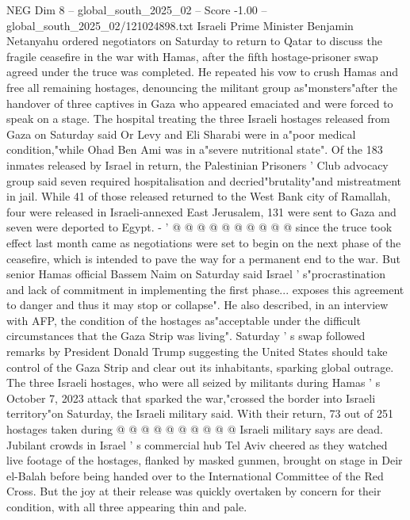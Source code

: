\begin{textsample}{NEG Dim 8 – global\_south\_2025\_02 – Score -1.00 – global\_south\_2025\_02/121024898.txt}  \label{ex:f8_neg_068}
Israeli Prime Minister Benjamin Netanyahu ordered negotiators on Saturday to return to Qatar to discuss the fragile ceasefire in the war with Hamas, after the fifth hostage-prisoner swap agreed under the truce was completed.
He repeated his vow to crush Hamas and free all remaining hostages, denouncing the militant group as"monsters"after the handover of three captives in Gaza who appeared emaciated and were forced to speak on a stage.
The hospital treating the three Israeli hostages released from Gaza on Saturday said Or Levy and Eli Sharabi were in a"poor medical condition,"while Ohad Ben Ami was in a"severe nutritional state".
Of the 183 inmates released by Israel in return, the Palestinian Prisoners ' Club advocacy group said seven required hospitalisation and decried"brutality"and mistreatment in jail.
While 41 of those released returned to the West Bank city of Ramallah, four were released in Israeli-annexed East Jerusalem, 131 were sent to Gaza and seven were deported to Egypt. - ' @ @ @ @ @ @ @ @ @ @ since the truce took effect last month came as negotiations were set to begin on the next phase of the ceasefire, which is intended to pave the way for a permanent end to the war.
But senior Hamas official Bassem Naim on Saturday said Israel ' s"procrastination and lack of commitment in implementing the first phase... exposes this agreement to danger and thus it may stop or collapse".
He also described, in an interview with AFP, the condition of the hostages as"acceptable under the difficult circumstances that the Gaza Strip was living".
Saturday ' s swap followed remarks by President Donald Trump suggesting the United States should take control of the Gaza Strip and clear out its inhabitants, sparking global outrage.
The three Israeli hostages, who were all seized by militants during Hamas ' s October 7, 2023 attack that sparked the war,"crossed the border into Israeli territory"on Saturday, the Israeli military said.
With their return, 73 out of 251 hostages taken during @ @ @ @ @ @ @ @ @ @ Israeli military says are dead.
Jubilant crowds in Israel ' s commercial hub Tel Aviv cheered as they watched live footage of the hostages, flanked by masked gunmen, brought on stage in Deir el-Balah before being handed over to the International Committee of the Red Cross.
But the joy at their release was quickly overtaken by concern for their condition, with all three appearing thin and pale.

\end{textsample}

